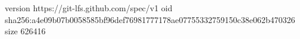 version https://git-lfs.github.com/spec/v1
oid sha256:a4e09b07b0058585bf96def76981777178ae07755332759150c38e062b470326
size 626416
